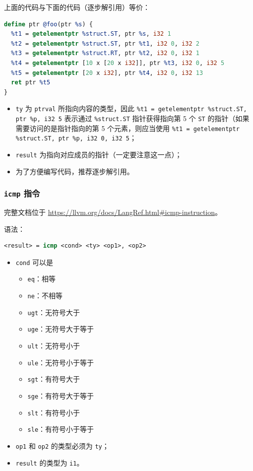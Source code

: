 上面的代码与下面的代码（逐步解引用）等价：
\begin{lstlisting}[language=llvm]define ptr @foo(ptr %s) {
  %t1 = getelementptr %struct.ST, ptr %s, i32 1
  %t2 = getelementptr %struct.ST, ptr %t1, i32 0, i32 2
  %t3 = getelementptr %struct.RT, ptr %t2, i32 0, i32 1
  %t4 = getelementptr [10 x [20 x i32]], ptr %t3, i32 0, i32 5
  %t5 = getelementptr [20 x i32], ptr %t4, i32 0, i32 13
  ret ptr %t5
}
\end{lstlisting}

\begin{itemize}
  \item \texttt{ty} 为 \texttt{ptrval} 所指向内容的类型，因此
    \texttt{\%t1 = getelementptr \%struct.ST, ptr \%p, i32 5}
    表示通过 \texttt{\%struct.ST} 指针获得指向第 5 个 \texttt{ST}
    的指针（如果需要访问的是指针指向的第 5 个元素，则应当使用
    \texttt{\%t1 = getelementptr \%struct.ST, ptr \%p, i32 0, i32 5}；
  \item \texttt{result} 为指向对应成员的指针（一定要注意这一点）；
  \item 为了方便编写代码，推荐逐步解引用。
\end{itemize}

\subsubsection{\texttt{icmp} 指令}\label{LLVM-icmp-instructions}

\begin{remark}
完整文档位于 \url{https://llvm.org/docs/LangRef.html\#icmp-instruction}。
\end{remark}

语法：
\begin{lstlisting}[language=llvm]
<result> = icmp <cond> <ty> <op1>, <op2>
\end{lstlisting}

\begin{itemize}
  \item \texttt{cond} 可以是
    \begin{itemize}
      \item \texttt{eq}：相等
      \item \texttt{ne}：不相等
      \item \texttt{ugt}：无符号大于
      \item \texttt{uge}：无符号大于等于
      \item \texttt{ult}：无符号小于
      \item \texttt{ule}：无符号小于等于
      \item \texttt{sgt}：有符号大于
      \item \texttt{sge}：有符号大于等于
      \item \texttt{slt}：有符号小于
      \item \texttt{sle}：有符号小于等于
    \end{itemize}
  \item \texttt{op1} 和 \texttt{op2} 的类型必须为 \texttt{ty}；
  \item \texttt{result} 的类型为 \texttt{i1}。
\end{itemize}

